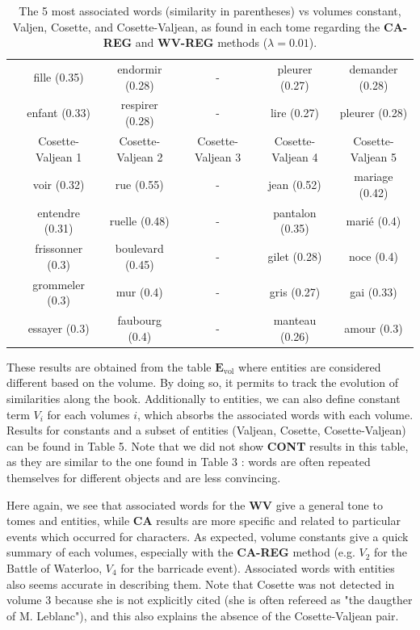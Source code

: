 \documentclass[
twocolumn,
]{ceurart}
\begin{document}
\begin{table}[!h]
\begin{tabular}{|c|c|c|c|c|c|}
		& fille (0.35) & endormir (0.28) & - & pleurer (0.27) & demander (0.28) \\
		& enfant (0.33) & respirer (0.28) & - & lire (0.27) & pleurer (0.28) \\
		\cline{2-6}
		& Cosette-Valjean 1 & Cosette-Valjean 2 & Cosette-Valjean 3 & Cosette-Valjean 4 & Cosette-Valjean 5 \\
		\cline{2-6}
		& voir (0.32) & rue (0.55) & - & jean (0.52) & mariage (0.42) \\ 
		& entendre (0.31) & ruelle (0.48) & - & pantalon (0.35) & marié (0.4) \\ 
		& frissonner (0.3) & boulevard (0.45) & - & gilet (0.28) & noce (0.4) \\ 
		& grommeler (0.3) & mur (0.4) & - & gris (0.27) & gai (0.33) \\ 
		& essayer (0.3) & faubourg (0.4) & - & manteau (0.26) & amour (0.3) \\ 
		\hline
	\end{tabular}
	\label{TIME_REG_word_vs_obj}
	\caption{The 5 most associated words (similarity in parentheses) vs volumes constant, Valjen, Cosette, and Cosette-Valjean, as found in each tome regarding the \textbf{CA-REG} and \textbf{WV-REG} methods ($\lambda = 0.01$).}
\end{table}

These results are obtained from the table $\mathbf{E}_\text{vol}$ where entities are considered different based on the volume. By doing so, it permits to track the evolution of similarities along the book. Additionally to entities, we can also define constant term $V_i$ for each volumes $i$, which absorbs the associated words with each volume. Results for constants and a subset of entities (Valjean, Cosette, Cosette-Valjean) can be found in Table 5. Note that we did not show \textbf{CONT} results in this table, as they are similar to the one found in Table 3 : words are often repeated themselves for different objects and are less convincing. 

Here again, we see that associated words for the \textbf{WV} give a general tone to tomes and entities, while \textbf{CA} results are more specific and related to particular events which occurred for characters. As expected, volume constants give a quick summary of each volumes, especially with the \textbf{CA-REG} method (e.g. $V_2$ for the Battle of Waterloo, $V_4$ for the barricade event). Associated words with entities also seems accurate in describing them. Note that Cosette was not detected in volume 3 because she is not explicitly cited (she is often refereed as "the daugther of M. Leblanc"), and this also explains the absence of the Cosette-Valjean pair. 
\end{document}
